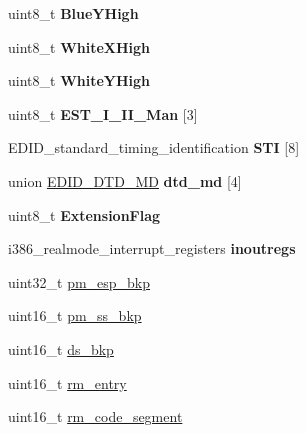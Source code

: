 \begin{DoxyCompactItemize}
uint8\+\_\+t {\bfseries Blue\+Y\+High}
\item 
\mbox{\label{structRTEMS__PACKED_a5c63069b505df78d9da660e208500fc2}} 
uint8\+\_\+t {\bfseries White\+X\+High}
\item 
\mbox{\label{structRTEMS__PACKED_a23c92942db02c25951d5c867adbf572c}} 
uint8\+\_\+t {\bfseries White\+Y\+High}
\item 
\mbox{\label{structRTEMS__PACKED_a85c083455307b8756deba4ac1ce1e788}} 
uint8\+\_\+t {\bfseries E\+S\+T\+\_\+\+I\+\_\+\+I\+I\+\_\+\+Man} \mbox{[}3\mbox{]}
\item 
\mbox{\label{structRTEMS__PACKED_a6dac982d89e6de1d92e0d31253470c08}} 
E\+D\+I\+D\+\_\+standard\+\_\+timing\+\_\+identification {\bfseries S\+TI} \mbox{[}8\mbox{]}
\item 
\mbox{\label{structRTEMS__PACKED_a11f3be27b3607619d8658cea9f0c0f00}} 
union \mbox{\hyperlink{unionEDID__DTD__MD}{E\+D\+I\+D\+\_\+\+D\+T\+D\+\_\+\+MD}} {\bfseries dtd\+\_\+md} \mbox{[}4\mbox{]}
\item 
\mbox{\label{structRTEMS__PACKED_a002ca0babcc439926b2f16ae82d464ec}} 
uint8\+\_\+t {\bfseries Extension\+Flag}
\item 
\mbox{\label{structRTEMS__PACKED_a4203577b3f191d3c3321f805a02dc8d9}} 
i386\+\_\+realmode\+\_\+interrupt\+\_\+registers {\bfseries inoutregs}
\item 
uint32\+\_\+t \mbox{\hyperlink{structRTEMS__PACKED_a805aa4788df5a9664fb97711e900846f}{pm\+\_\+esp\+\_\+bkp}}
\item 
uint16\+\_\+t \mbox{\hyperlink{structRTEMS__PACKED_a01d0a07eb15cc3e69eaf08bf6af2cbf6}{pm\+\_\+ss\+\_\+bkp}}
\item 
uint16\+\_\+t \mbox{\hyperlink{structRTEMS__PACKED_add4c54dc21aa6e45dc9540e787536087}{ds\+\_\+bkp}}
\item 
uint16\+\_\+t \mbox{\hyperlink{structRTEMS__PACKED_a15eb06ecbb249834303e13825a347dad}{rm\+\_\+entry}}
\item 
uint16\+\_\+t \mbox{\hyperlink{structRTEMS__PACKED_ad722afc7174d81a83e7020b2c0c46aca}{rm\+\_\+code\+\_\+segment}}
\item 

\end{DoxyCompactItemize}
